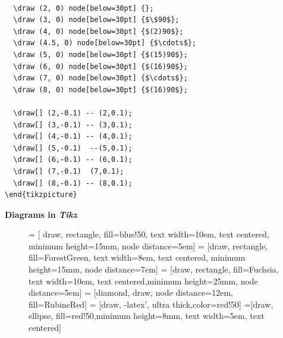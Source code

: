 \documentclass{beamer}\usepackage[]{graphicx}\usepackage[]{color}
\begin{document}
\begin{frame}[fragile]
\begin{verbatim}
        
  \draw (2, 0) node[below=30pt] {};
  \draw (3, 0) node[below=30pt] {$\$90$};
  \draw (4, 0) node[below=30pt] {$(2)90$};
  \draw (4.5, 0) node[below=30pt] {$\cdots$};
  \draw (5, 0) node[below=30pt] {$(15)90$};
  \draw (6, 0) node[below=30pt] {$(16)90$};
  \draw (7, 0) node[below=30pt] {$\cdots$};
  \draw (8, 0) node[below=30pt] {$(16)90$};       
        
  \draw[] (2,-0.1) -- (2,0.1);
  \draw[] (3,-0.1) -- (3,0.1);
  \draw[] (4,-0.1) -- (4,0.1);
  \draw[] (5,-0.1)  --(5,0.1);
  \draw[] (6,-0.1) -- (6,0.1);
  \draw[] (7,-0.1)  (7,0.1);
  \draw[] (8,-0.1) -- (8,0.1);
\end{tikzpicture}
\end{verbatim}   
\end{frame}

\begin{frame}[fragile]
\textbf{\large{Diagrams in \textrm{\emph{Tikz}}}}

\begin{figure}[!h]
\centering
{} = [ draw, rectangle, fill=blue!50, text width=10em, text centered, minimum 
                      height=15mm, node distance=5em]
 = [draw, rectangle, fill=ForestGreen, text width=8em, text centered,        
                      minimum height=15mm, node distance=7em]
 = [draw, rectangle, fill=Fuchsia, text width=10em, text centered,minimum 
                      height=25mm, node distance=5em]
 = [diamond, draw, node distance=12em, fill=RubineRed]
 = [draw, -latex', ultra thick,color=red!50]
=[draw, ellipse, fill=red!50,minimum height=8mm, text width=5em, text centered]
\end{figure}
\end{frame}
\end{document}
